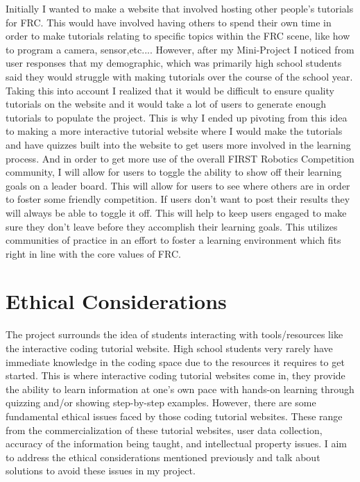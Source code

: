 \documentclass[10pt,twocolumn]{article}
\begin{document}
Initially I wanted to make a website that involved hosting other people's tutorials for FRC. This would have involved having others to spend their own time in order to make tutorials relating to specific topics within the FRC scene, like how to program a camera, sensor,etc.... However, after my Mini-Project I noticed from user responses that my demographic, which was primarily high school students said they would struggle with making tutorials over the course of the school year. Taking this into account I realized that it would be difficult to ensure quality tutorials on the website and it would take a lot of users to generate enough tutorials to populate the project. This is why I ended up pivoting from this idea to making a more interactive tutorial website where I would make the tutorials and have quizzes built into the website to get users more involved in the learning process. And in order to get more use of the overall FIRST Robotics Competition community, I will allow for users to toggle the ability to show off their learning goals on a leader board. This will allow for users to see where others are in order to foster some friendly competition. If users don't want to post their results they will always be able to toggle it off. This will help to keep users engaged to make sure they don't leave before they accomplish their learning goals. This utilizes communities of practice in an effort to foster a learning environment which fits right in line with the core values of FRC.


\section{Ethical Considerations}
The project surrounds the idea of students interacting with tools/resources like the interactive coding tutorial website. High school students very rarely have immediate knowledge in the coding space due to the resources it requires to get started. This is where interactive coding tutorial websites come in, they provide the ability to learn information at one's own pace with hands-on learning through quizzing and/or showing step-by-step examples. However, there are some fundamental ethical issues faced by those coding tutorial websites. These range from the commercialization of these tutorial websites, user data collection, accuracy of the information being taught, and intellectual property issues. I aim to address the ethical considerations mentioned previously and talk about solutions to avoid these issues in my project. 
\end{document}
